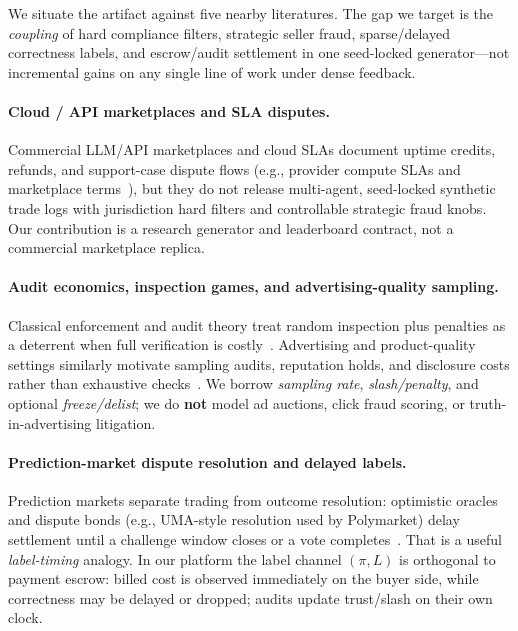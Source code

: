\documentclass[sigconf,review]{acmart}
\begin{document}
We situate the artifact against five nearby literatures. The gap we target is the \emph{coupling} of hard compliance filters, strategic seller fraud, sparse/delayed correctness labels, and escrow/audit settlement in one seed-locked generator---not incremental gains on any single line of work under dense feedback.

\paragraph{Cloud / API marketplaces and SLA disputes.} Commercial LLM/API marketplaces and cloud SLAs document uptime credits, refunds, and support-case dispute flows (e.g., provider compute SLAs and marketplace terms~\cite{aws2024compute_sla}), but they do not release multi-agent, seed-locked synthetic trade logs with jurisdiction hard filters and controllable strategic fraud knobs. Our contribution is a research generator and leaderboard contract, not a commercial marketplace replica.

\paragraph{Audit economics, inspection games, and advertising-quality sampling.} Classical enforcement and audit theory treat random inspection plus penalties as a deterrent when full verification is costly~\cite{becker1968crime,avenhaus2002inspection}. Advertising and product-quality settings similarly motivate sampling audits, reputation holds, and disclosure costs rather than exhaustive checks~\cite{daughety2008communicating,bester2021signaling}. We borrow \emph{sampling rate}, \emph{slash/penalty}, and optional \emph{freeze/delist}; we do \textbf{not} model ad auctions, click fraud scoring, or truth-in-advertising litigation.

\paragraph{Prediction-market dispute resolution and delayed labels.} Prediction markets separate trading from outcome resolution: optimistic oracles and dispute bonds (e.g., UMA-style resolution used by Polymarket) delay settlement until a challenge window closes or a vote completes~\cite{wolfers2004prediction,hanson2003combinatorial,uma2024optimistic,polymarket2024resolution}. That is a useful \emph{label-timing} analogy. In our platform the label channel $(\pi, L)$ is orthogonal to payment escrow: billed cost is observed immediately on the buyer side, while correctness may be delayed or dropped; audits update trust/slash on their own clock.
\end{document}
